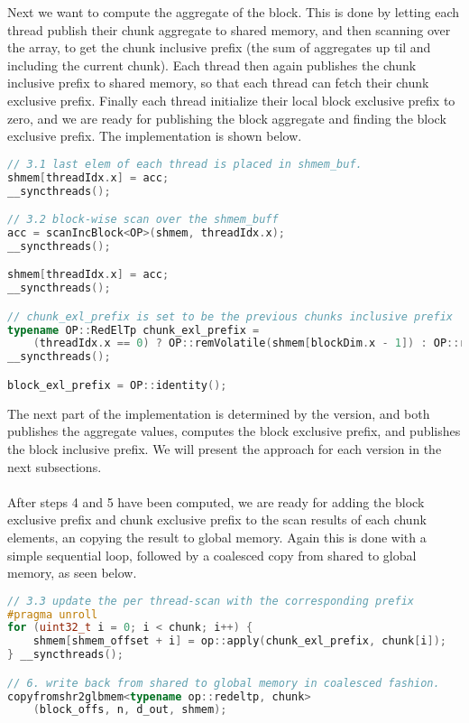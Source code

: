 Next we want to compute the aggregate of the block.
This is done by letting each thread publish their chunk aggregate to shared memory, and then scanning over the array, to get the chunk inclusive prefix (the sum of aggregates up til and including the current chunk).
Each thread then again publishes the chunk inclusive prefix to shared memory, so that each thread can fetch their chunk exclusive prefix.
Finally each thread initialize their local block exclusive prefix to zero, and we are ready for publishing the block aggregate and finding the block exclusive prefix.
The implementation is shown below.
\begin{lstlisting}[language=c++]
// 3.1 last elem of each thread is placed in shmem_buf.
shmem[threadIdx.x] = acc;
__syncthreads();

// 3.2 block-wise scan over the shmem_buff
acc = scanIncBlock<OP>(shmem, threadIdx.x);
__syncthreads();

shmem[threadIdx.x] = acc;
__syncthreads();

// chunk_exl_prefix is set to be the previous chunks inclusive prefix
typename OP::RedElTp chunk_exl_prefix =
    (threadIdx.x == 0) ? OP::remVolatile(shmem[blockDim.x - 1]) : OP::remVolatile(shmem[threadIdx.x - 1]);
__syncthreads();

block_exl_prefix = OP::identity();
\end{lstlisting}

The next part of the implementation is determined by the version, and both publishes the aggregate values, computes the block exclusive prefix, and publishes the block inclusive prefix.
We will present the approach for each version in the next subsections.
\\~\\

After steps 4 and 5 have been computed, we are ready for adding the block exclusive prefix and chunk exclusive prefix to the scan results of each chunk elements, an copying the result to global memory.
Again this is done with a simple sequential loop, followed by a coalesced copy from shared to global memory, as seen below.
\begin{lstlisting}[language=c++]
// 3.3 update the per thread-scan with the corresponding prefix
#pragma unroll
for (uint32_t i = 0; i < chunk; i++) {
    shmem[shmem_offset + i] = op::apply(chunk_exl_prefix, chunk[i]);
} __syncthreads();

// 6. write back from shared to global memory in coalesced fashion.
copyfromshr2glbmem<typename op::redeltp, chunk>
    (block_offs, n, d_out, shmem);
\end{lstlisting}

